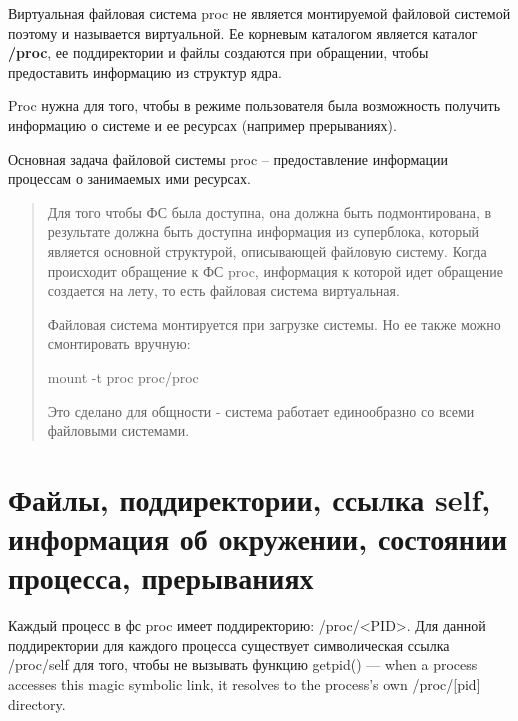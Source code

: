 Виртуальная файловая система proc не является монтируемой файловой системой поэтому и называется виртуальной. Ее корневым каталогом является каталог \textbf{/proc}, ее поддиректории и файлы создаются при обращении, чтобы предоставить информацию из структур ядра. 

Proc нужна для того, чтобы в режиме пользователя была возможность получить информацию о системе и ее ресурсах (например прерываниях). 

Основная задача файловой системы proc -- предоставление информации процессам о занимаемых ими ресурсах. 

\begin{quote}
Для того чтобы ФС была доступна, она должна быть подмонтирована, в результате должна быть доступна информация из суперблока, который является основной структурой, описывающей файловую систему. Когда происходит обращение к ФС proc, информация к которой идет обращение создается на лету, то есть файловая система виртуальная.

Файловая система монтируется при загрузке системы. Но ее также можно смонтировать вручную:

mount -t proc proc/proc

Это сделано для общности - система работает единообразно со всеми файловыми системами.
\end{quote}

\section{Файлы, поддиректории, ссылка self, информация об окружении, состоянии процесса, прерываниях}

Каждый процесс в фс proc имеет поддиректорию: /proc/<PID>. Для данной поддиректории для каждого процесса существует символическая ссылка /proc/self для того, чтобы не вызывать функцию getpid() --- when a process accesses this magic symbolic link, it resolves to the process's own /proc/[pid] directory. 

